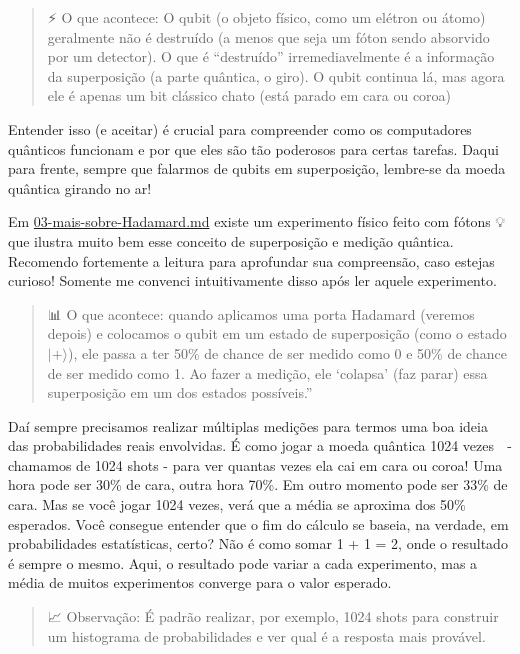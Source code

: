 \documentclass[
  brazilian,
]{report}
\begin{document}
\begin{quote}
⚡ O que acontece: O qubit (o objeto físico, como um elétron ou átomo)
geralmente não é destruído (a menos que seja um fóton sendo absorvido
por um detector). O que é ``destruído'' irremediavelmente é a informação
da superposição (a parte quântica, o giro). O qubit continua lá, mas
agora ele é apenas um bit clássico chato (está parado em cara ou coroa)
\end{quote}

Entender isso (e aceitar) é crucial para compreender como os
computadores quânticos funcionam e por que eles são tão poderosos para
certas tarefas. Daqui para frente, sempre que falarmos de qubits em
superposição, lembre-se da moeda quântica girando no ar!

Em \url{03-mais-sobre-Hadamard.md} existe um experimento físico feito
com fótons 💡 que ilustra muito bem esse conceito de superposição e
medição quântica. Recomendo fortemente a leitura para aprofundar sua
compreensão, caso estejas curioso! Somente me convenci intuitivamente
disso após ler aquele experimento.

\begin{quote}
📊 O que acontece: quando aplicamos uma porta Hadamard (veremos depois)
e colocamos o qubit em um estado de superposição (como o estado
\(|+\rangle\)), ele passa a ter 50\% de chance de ser medido como 0 e
50\% de chance de ser medido como 1. Ao fazer a medição, ele `colapsa'
(faz parar) essa superposição em um dos estados possíveis.''
\end{quote}

Daí sempre precisamos realizar múltiplas medições para termos uma boa
ideia das probabilidades reais envolvidas. É como jogar a moeda quântica
1024 vezes 🎲 - chamamos de 1024 shots - para ver quantas vezes ela cai
em cara ou coroa! Uma hora pode ser 30\% de cara, outra hora 70\%. Em
outro momento pode ser 33\% de cara. Mas se você jogar 1024 vezes, verá
que a média se aproxima dos 50\% esperados. Você consegue entender que o
fim do cálculo se baseia, na verdade, em probabilidades estatísticas,
certo? Não é como somar 1 + 1 = 2, onde o resultado é sempre o mesmo.
Aqui, o resultado pode variar a cada experimento, mas a média de muitos
experimentos converge para o valor esperado.

\begin{quote}
📈 Observação: É padrão realizar, por exemplo, 1024 shots para construir
um histograma de probabilidades e ver qual é a resposta mais provável.
\end{quote}
\end{document}
